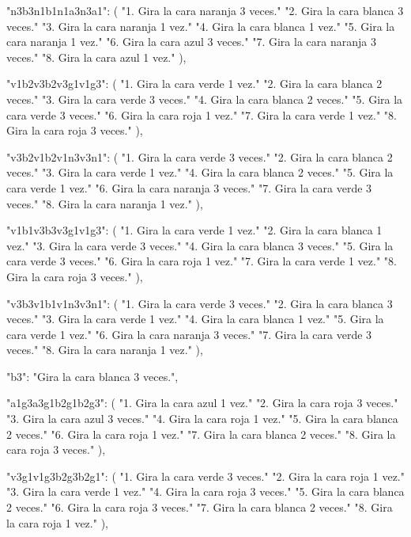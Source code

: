 {{    "n3b3n1b1n1a3n3a1": (
        "1. Gira la cara naranja 3 veces.\n"
        "2. Gira la cara blanca 3 veces.\n"
        "3. Gira la cara naranja 1 vez.\n"
        "4. Gira la cara blanca 1 vez.\n"
        "5. Gira la cara naranja 1 vez.\n"
        "6. Gira la cara azul 3 veces.\n"
        "7. Gira la cara naranja 3 veces.\n"
        "8. Gira la cara azul 1 vez."
    ),
    
    "v1b2v3b2v3g1v1g3": (
        "1. Gira la cara verde 1 vez.\n"
        "2. Gira la cara blanca 2 veces.\n"
        "3. Gira la cara verde 3 veces.\n"
        "4. Gira la cara blanca 2 veces.\n"
        "5. Gira la cara verde 3 veces.\n"
        "6. Gira la cara roja 1 vez.\n"
        "7. Gira la cara verde 1 vez.\n"
        "8. Gira la cara roja 3 veces."
    ),
    
    "v3b2v1b2v1n3v3n1": (
        "1. Gira la cara verde 3 veces.\n"
        "2. Gira la cara blanca 2 veces.\n"
        "3. Gira la cara verde 1 vez.\n"
        "4. Gira la cara blanca 2 veces.\n"
        "5. Gira la cara verde 1 vez.\n"
        "6. Gira la cara naranja 3 veces.\n"
        "7. Gira la cara verde 3 veces.\n"
        "8. Gira la cara naranja 1 vez."
    ),
    
    "v1b1v3b3v3g1v1g3": (
        "1. Gira la cara verde 1 vez.\n"
        "2. Gira la cara blanca 1 vez.\n"
        "3. Gira la cara verde 3 veces.\n"
        "4. Gira la cara blanca 3 veces.\n"
        "5. Gira la cara verde 3 veces.\n"
        "6. Gira la cara roja 1 vez.\n"
        "7. Gira la cara verde 1 vez.\n"
        "8. Gira la cara roja 3 veces."
    ),
    
    "v3b3v1b1v1n3v3n1": (
        "1. Gira la cara verde 3 veces.\n"
        "2. Gira la cara blanca 3 veces.\n"
        "3. Gira la cara verde 1 vez.\n"
        "4. Gira la cara blanca 1 vez.\n"
        "5. Gira la cara verde 1 vez.\n"
        "6. Gira la cara naranja 3 veces.\n"
        "7. Gira la cara verde 3 veces.\n"
        "8. Gira la cara naranja 1 vez."
    ),
    
    "b3": "Gira la cara blanca 3 veces.",
    
    "a1g3a3g1b2g1b2g3": (
        "1. Gira la cara azul 1 vez.\n"
        "2. Gira la cara roja 3 veces.\n"
        "3. Gira la cara azul 3 veces.\n"
        "4. Gira la cara roja 1 vez.\n"
        "5. Gira la cara blanca 2 veces.\n"
        "6. Gira la cara roja 1 vez.\n"
        "7. Gira la cara blanca 2 veces.\n"
        "8. Gira la cara roja 3 veces."
    ),
    
    "v3g1v1g3b2g3b2g1": (
        "1. Gira la cara verde 3 veces.\n"
        "2. Gira la cara roja 1 vez.\n"
        "3. Gira la cara verde 1 vez.\n"
        "4. Gira la cara roja 3 veces.\n"
        "5. Gira la cara blanca 2 veces.\n"
        "6. Gira la cara roja 3 veces.\n"
        "7. Gira la cara blanca 2 veces.\n"
        "8. Gira la cara roja 1 vez."
    ),
    
}}
